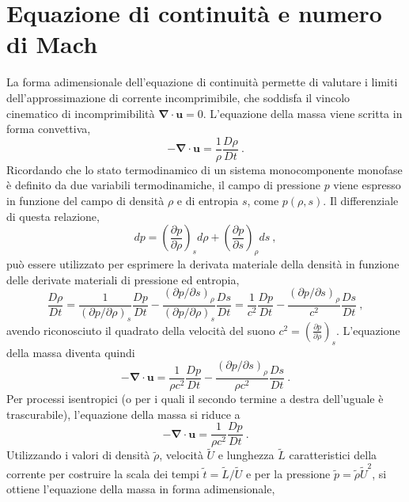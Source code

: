 \section{Equazione di continuità e numero di Mach}
La forma adimensionale dell'equazione di continuità permette di valutare i limiti dell'approssimazione di corrente incomprimibile, che soddisfa il vincolo cinematico di incomprimibilità $\bm{\nabla} \cdot \bm{u} = 0$.
L'equazione della massa viene scritta in forma convettiva,
\begin{equation}
 - \bm{\nabla} \cdot \bm{u} = \dfrac{1}{\rho}\dfrac{D \rho}{D t} \ .
\end{equation}
Ricordando che lo stato termodinamico di un sistema monocomponente monofase è definito da due variabili termodinamiche, il campo di pressione $p$ viene espresso in funzione del campo di densità $\rho$ e di entropia $s$, come $p(\rho,s)$. Il differenziale di questa relazione,
\begin{equation}
 d p = \left(\dfrac{\partial p}{\partial \rho}\right)_s d \rho +
       \left(\dfrac{\partial p}{\partial s}\right)_{\rho} d s \ ,
\end{equation}
può essere utilizzato per esprimere la derivata materiale della densità in funzione delle derivate materiali di pressione ed entropia,
\begin{equation}
 \dfrac{D \rho}{D t} = \dfrac{1}{\left(\partial p/\partial \rho\right)_s}\dfrac{D p}{D t} - \dfrac{\left(\partial p/\partial s\right)_{\rho}}{\left(\partial p/\partial \rho\right)_s}\dfrac{D s}{D t} = \dfrac{1}{c^2}\dfrac{D p}{D t} - \dfrac{\left(\partial p/\partial s\right)_{\rho}}{c^2}\dfrac{D s}{D t} \ ,
\end{equation}
avendo riconosciuto il quadrato della velocità del suono $c^2 = \left(\frac{\partial p}{\partial \rho}\right)_s$. L'equazione della massa diventa quindi
\begin{equation}
  - \bm{\nabla} \cdot \bm{u} = \dfrac{1}{\rho c^2}\dfrac{D p}{D t} - \dfrac{\left(\partial p/\partial s\right)_{\rho}}{\rho c^2}\dfrac{D s}{D t} \ .
\end{equation}
Per processi isentropici (o per i quali il secondo termine a destra dell'uguale è trascurabile), l'equazione della massa si riduce a
\begin{equation}
  - \bm{\nabla} \cdot \bm{u} = \dfrac{1}{\rho c^2}\dfrac{D p}{D t} \ .
\end{equation}
Utilizzando i valori di densità $\tilde{\rho}$, velocità $\tilde{U}$ e lunghezza $\tilde{L}$ caratteristici della corrente per costruire la scala dei tempi $\tilde{t} = \tilde{L}/\tilde{U}$ e per la pressione $\tilde{p} = \tilde{\rho} \tilde{U}^2$, si ottiene l'equazione della massa in forma adimensionale,
